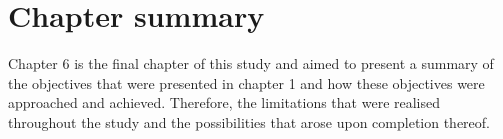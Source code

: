 \section{Chapter summary}

Chapter 6 is the final chapter of this study and aimed to present a summary of the objectives that were presented in chapter 1 and how these objectives were approached and achieved. Therefore, the limitations that were realised throughout the study and the possibilities that arose upon completion thereof.